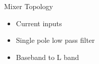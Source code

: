 \documentclass[10pt]{beamer}
\begin{document}
\begin{frame}{Mixer Topology}

\begin{figure}[h]
\end{figure}

\begin{itemize}
 \item Current inputs
 \item Single pole low pass filter
 \item Baseband to L band
\end{itemize}

\end{frame}
\end{document}
